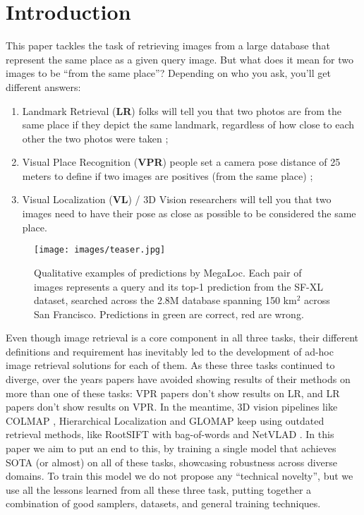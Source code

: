 
\section{Introduction}
\label{sec:introduction}

This paper tackles the task of retrieving images from a large database that represent the same place as a given query image.
But what does it mean for two images to be ``from the same place''?
Depending on who you ask, you'll get different answers:
\begin{enumerate}
    \item Landmark Retrieval (\textbf{LR}) folks will tell you that two photos are from the same place if they depict the same landmark, regardless of how close to each other the two photos were taken \cite{Weyand_2020_gldv2};
    \item Visual Place Recognition (\textbf{VPR}) people set a camera pose distance of 25 meters to define if two images are positives (\ie from the same place) \cite{Arandjelovic_2018_netvlad};
    \item Visual Localization (\textbf{VL}) / 3D Vision researchers will tell you that two images need to have their pose as close as possible to be considered the same place.
\end{enumerate}

\begin{figure}
    \begin{center}
    \texttt{[image: images/teaser.jpg]}
    \end{center}
    \caption{Qualitative examples of predictions by MegaLoc. Each pair of images represents a query and its top-1 prediction from the SF-XL dataset, searched across the 2.8M database spanning 150 km$^2$ across San Francisco. Predictions in green are correct, red are wrong.}
    \label{fig:teaser}
\end{figure}

Even though image retrieval is a core component in all three tasks, their different definitions and requirement has inevitably led to the development of ad-hoc image retrieval solutions for each of them.
As these three tasks continued to diverge, over the years papers have avoided showing results of their methods on more than one of these tasks: VPR papers don't show results on LR, and LR papers don't show results on VPR.
In the meantime, 3D vision pipelines like COLMAP \cite{Schoenberger_2016_sfm_colmap}, Hierarchical Localization \cite{Sarlin_2019_hloc} and GLOMAP \cite{pan2024glomap} keep using outdated retrieval methods, like RootSIFT with bag-of-words \cite{Arandjelovic_2012_rootSift, Schonberger_2016_retrieval, Csurka_2003_bow} and NetVLAD \cite{Arandjelovic_2018_netvlad}.
In this paper we aim to put an end to this, by training a single model that achieves SOTA (or almost) on all of these tasks, showcasing robustness across diverse domains.
To train this model we do not propose any ``technical novelty'', but we use all the lessons learned from all these three task, putting together a combination of good samplers, datasets, and general training techniques.

